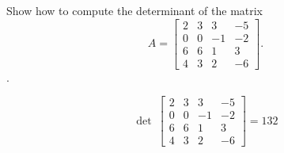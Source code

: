 
\begin{exerciseStatement}


Show how to compute the determinant of the matrix \[A= \left[\begin{array}{cccc}
2 & 3 & 3 & -5 \\
0 & 0 & -1 & -2 \\
6 & 6 & 1 & 3 \\
4 & 3 & 2 & -6
\end{array}\right] .\].


\end{exerciseStatement}
    
\begin{exerciseAnswer} 
\[\operatorname{det}\  \left[\begin{array}{cccc}
2 & 3 & 3 & -5 \\
0 & 0 & -1 & -2 \\
6 & 6 & 1 & 3 \\
4 & 3 & 2 & -6
\end{array}\right] = 132 \]
\end{exerciseAnswer}
    
